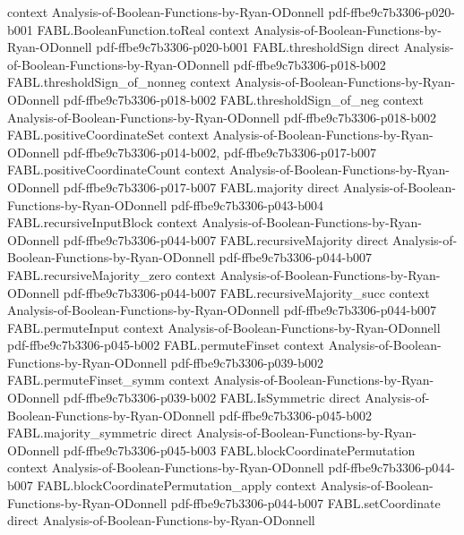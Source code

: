 \begin{theorem}
  {context}
  {Analysis-of-Boolean-Functions-by-Ryan-ODonnell}
  {pdf-ffbe9c7b3306-p020-b001}
\proofstep
  {FABL.BooleanFunction.toReal}
  {context}
  {Analysis-of-Boolean-Functions-by-Ryan-ODonnell}
  {pdf-ffbe9c7b3306-p020-b001}
\proofstep
  {FABL.thresholdSign}
  {direct}
  {Analysis-of-Boolean-Functions-by-Ryan-ODonnell}
  {pdf-ffbe9c7b3306-p018-b002}
\proofstep
  {FABL.thresholdSign_of_nonneg}
  {context}
  {Analysis-of-Boolean-Functions-by-Ryan-ODonnell}
  {pdf-ffbe9c7b3306-p018-b002}
\proofstep
  {FABL.thresholdSign_of_neg}
  {context}
  {Analysis-of-Boolean-Functions-by-Ryan-ODonnell}
  {pdf-ffbe9c7b3306-p018-b002}
\proofstep
  {FABL.positiveCoordinateSet}
  {context}
  {Analysis-of-Boolean-Functions-by-Ryan-ODonnell}
  {pdf-ffbe9c7b3306-p014-b002,
    pdf-ffbe9c7b3306-p017-b007}
\proofstep
  {FABL.positiveCoordinateCount}
  {context}
  {Analysis-of-Boolean-Functions-by-Ryan-ODonnell}
  {pdf-ffbe9c7b3306-p017-b007}
\proofstep
  {FABL.majority}
  {direct}
  {Analysis-of-Boolean-Functions-by-Ryan-ODonnell}
  {pdf-ffbe9c7b3306-p043-b004}
\proofstep
  {FABL.recursiveInputBlock}
  {context}
  {Analysis-of-Boolean-Functions-by-Ryan-ODonnell}
  {pdf-ffbe9c7b3306-p044-b007}
\proofstep
  {FABL.recursiveMajority}
  {direct}
  {Analysis-of-Boolean-Functions-by-Ryan-ODonnell}
  {pdf-ffbe9c7b3306-p044-b007}
\proofstep
  {FABL.recursiveMajority_zero}
  {context}
  {Analysis-of-Boolean-Functions-by-Ryan-ODonnell}
  {pdf-ffbe9c7b3306-p044-b007}
\proofstep
  {FABL.recursiveMajority_succ}
  {context}
  {Analysis-of-Boolean-Functions-by-Ryan-ODonnell}
  {pdf-ffbe9c7b3306-p044-b007}
\proofstep
  {FABL.permuteInput}
  {context}
  {Analysis-of-Boolean-Functions-by-Ryan-ODonnell}
  {pdf-ffbe9c7b3306-p045-b002}
\proofstep
  {FABL.permuteFinset}
  {context}
  {Analysis-of-Boolean-Functions-by-Ryan-ODonnell}
  {pdf-ffbe9c7b3306-p039-b002}
\proofstep
  {FABL.permuteFinset_symm}
  {context}
  {Analysis-of-Boolean-Functions-by-Ryan-ODonnell}
  {pdf-ffbe9c7b3306-p039-b002}
\proofstep
  {FABL.IsSymmetric}
  {direct}
  {Analysis-of-Boolean-Functions-by-Ryan-ODonnell}
  {pdf-ffbe9c7b3306-p045-b002}
\proofstep
  {FABL.majority_symmetric}
  {direct}
  {Analysis-of-Boolean-Functions-by-Ryan-ODonnell}
  {pdf-ffbe9c7b3306-p045-b003}
\proofstep
  {FABL.blockCoordinatePermutation}
  {context}
  {Analysis-of-Boolean-Functions-by-Ryan-ODonnell}
  {pdf-ffbe9c7b3306-p044-b007}
\proofstep
  {FABL.blockCoordinatePermutation_apply}
  {context}
  {Analysis-of-Boolean-Functions-by-Ryan-ODonnell}
  {pdf-ffbe9c7b3306-p044-b007}
\proofstep
  {FABL.setCoordinate}
  {direct}
  {Analysis-of-Boolean-Functions-by-Ryan-ODonnell}

\end{theorem}
